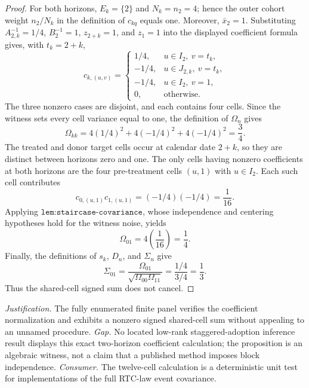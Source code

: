 \documentclass{article}
\begin{document}
\begin{proof}
For both horizons, \(E_k=\{2\}\) and \(N_k=n_2=4\); hence the outer
cohort weight \(n_2/N_k\) in the definition of \(c_{kq}\) equals one.
Moreover, \(\bar x_2=1\).  Substituting
\(A_{2,k}^{-1}=1/4\), \(B_2^{-1}=1\), \(z_{2+k}=1\), and \(z_1=1\)
into the displayed coefficient formula gives, with \(t_k=2+k\),
\[
 c_{k,(u,v)}=
 \begin{cases}
  1/4,&u\in I_2,\ v=t_k,\\
 -1/4,&u\in J_{2,k},\ v=t_k,\\
 -1/4,&u\in I_2,\ v=1,\\
 0,&\text{otherwise}.
 \end{cases}
\]
The three nonzero cases are disjoint, and each contains four cells.  Since
the witness sets every cell variance equal to one, the definition of
\(\Omega_n\) gives
\[
 \Omega_{kk}
 =4(1/4)^2+4(-1/4)^2+4(-1/4)^2
 =\frac34.
\]
The treated and donor target cells occur at calendar date \(2+k\), so they
are distinct between horizons zero and one.  The only cells having nonzero
coefficients at both horizons are the four pre-treatment cells \((u,1)\)
with \(u\in I_2\).  Each such cell contributes
\[
 c_{0,(u,1)}c_{1,(u,1)}=(-1/4)(-1/4)=\frac1{16}.
\]
Applying \(\texttt{lem:staircase-covariance}\), whose independence and
centering hypotheses hold for the witness noise, yields
\[
 \Omega_{01}=4\left(\frac1{16}\right)=\frac14.
\]
Finally, the definitions of \(s_k\), \(D_n\), and \(\Sigma_n\) give
\[
 \Sigma_{01}
 =\frac{\Omega_{01}}{\sqrt{\Omega_{00}\Omega_{11}}}
 =\frac{1/4}{3/4}=\frac13.
\]
Thus the shared-cell signed sum does not cancel.
\end{proof}
\par\smallskip\noindent \textit{Justification.} The fully enumerated finite panel verifies the coefficient normalization and exhibits a nonzero signed shared-cell sum without appealing to an unnamed procedure. \textit{Gap.} No located low-rank staggered-adoption inference result displays this exact two-horizon coefficient calculation; the proposition is an algebraic witness, not a claim that a published method imposes block independence. \textit{Consumer.} The twelve-cell calculation is a deterministic unit test for implementations of the full RTC-law event covariance.
\end{document}
